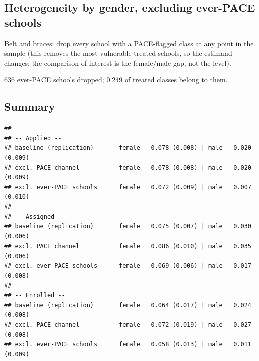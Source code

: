 \documentclass[
]{article}
\begin{document}
\hypertarget{heterogeneity-by-gender-excluding-ever-pace-schools}{%
\subsection{Heterogeneity by gender, excluding ever-PACE
schools}\label{heterogeneity-by-gender-excluding-ever-pace-schools}}

Belt and braces: drop every school with a PACE-flagged class at any
point in the sample (this removes the most vulnerable treated schools,
so the estimand changes; the comparison of interest is the female/male
gap, not the level).

636 ever-PACE schools dropped; 0.249 of treated classes belong to them.

\begin{table}[htbp]
   \caption{Regression Results by Gender, Excluding Ever-PACE Schools}\label{tab: results by gender excl pace schools}
   \centerline{}
\end{table}

\hypertarget{summary}{%
\subsection{Summary}\label{summary}}

\begin{verbatim}
## 
## -- Applied --
## baseline (replication)       female   0.078 (0.008) | male   0.020 (0.009)
## excl. PACE channel           female   0.078 (0.008) | male   0.020 (0.009)
## excl. ever-PACE schools      female   0.072 (0.009) | male   0.007 (0.010)
## 
## -- Assigned --
## baseline (replication)       female   0.075 (0.007) | male   0.030 (0.006)
## excl. PACE channel           female   0.086 (0.010) | male   0.035 (0.006)
## excl. ever-PACE schools      female   0.069 (0.006) | male   0.017 (0.008)
## 
## -- Enrolled --
## baseline (replication)       female   0.064 (0.017) | male   0.024 (0.008)
## excl. PACE channel           female   0.072 (0.019) | male   0.027 (0.008)
## excl. ever-PACE schools      female   0.058 (0.013) | male   0.011 (0.009)
\end{verbatim}
\end{document}
